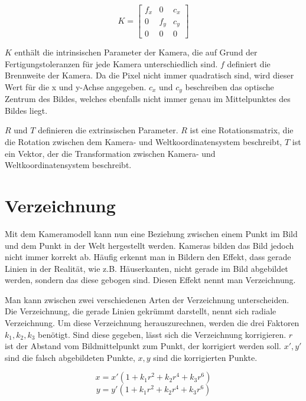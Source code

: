 \begin{equation}
  K = 
  \begin{bmatrix}
  	f_x & 0 & c_x \\
  	0 & f_y & c_y \\
  	0 & 0 & 0
  \end{bmatrix}
\end{equation}

$K$ enthält die intrinsischen Parameter der Kamera, die auf Grund der Fertigungstoleranzen für jede Kamera unterschiedlich sind. $f$ definiert die Brennweite der Kamera. Da die Pixel nicht immer quadratisch sind, wird dieser Wert für die x und y-Achse angegeben. $c_x$ und $c_y$ beschreiben das optische Zentrum des Bildes, welches ebenfalls nicht immer genau im Mittelpunktes des Bildes liegt.

$R$ und $T$ definieren die extrinsischen Parameter. $R$ ist eine Rotationsmatrix, die die Rotation zwischen dem Kamera- und Weltkoordinatensystem beschreibt, $T$ ist ein Vektor, der die Transformation zwischen Kamera- und Weltkoordinatensystem beschreibt.

\section{Verzeichnung} %
\label{sec:verzeichnung}
Mit dem Kameramodell kann nun eine Beziehung zwischen einem Punkt im Bild und dem Punkt in der Welt hergestellt werden. Kameras bilden das Bild jedoch nicht immer korrekt ab. Häufig erkennt man in Bildern den Effekt, dass gerade Linien in der Realität, wie z.B. Häuserkanten, nicht gerade im Bild abgebildet werden, sondern das diese gebogen sind. Diesen Effekt nennt man Verzeichnung.

Man kann zwischen zwei verschiedenen Arten der Verzeichnung unterscheiden. Die Verzeichnung, die gerade Linien gekrümmt darstellt, nennt sich radiale Verzeichnung. Um diese Verzeichnung herauszurechnen, werden die drei Faktoren $k_1, k_2, k_3$ benötigt. Sind diese gegeben, lässt sich die Verzeichnung korrigieren. $r$ ist der Abstand vom Bildmittelpunkt zum Punkt, der korrigiert werden soll. $x', y'$ sind die falsch abgebildeten Punkte, $x,y$ sind die korrigierten Punkte.

\begin{equation}
	x = x'(1 + k_1 r^2 + k_2 r^4 + k_3 r^6)
\end{equation}
\begin{equation}
	y = y'(1 + k_1 r^2 + k_2 r^4 + k_3 r^6)
\end{equation}

